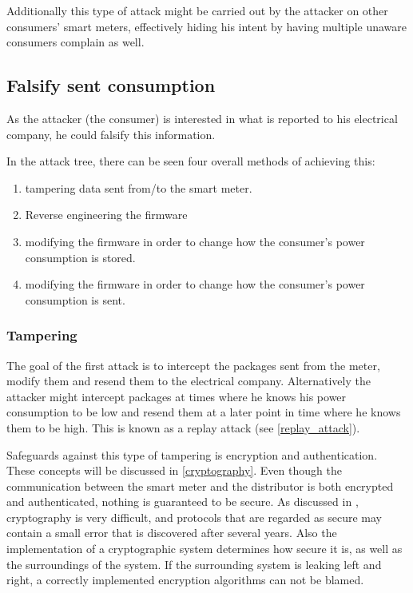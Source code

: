 Additionally this type of attack might be carried out by the attacker on other consumers' smart meters, effectively hiding his intent by having multiple unaware consumers complain as well.

\subsection{Falsify sent consumption}
As the attacker (the consumer) is interested in what is reported to his electrical company, he could falsify this information.

In the attack tree, there can be seen four overall methods of achieving this:
\begin{enumerate}
  \item tampering data sent from/to the smart meter.
  \item Reverse engineering the firmware 
  \item modifying the firmware in order to change how the consumer's power consumption is stored.
  \item modifying the firmware in order to change how the consumer's power consumption is sent.
\end{enumerate}

\subsubsection{Tampering}
The goal of the first attack is to intercept the packages sent from the meter, modify them and resend them to the electrical company.
Alternatively the attacker might intercept packages at times where he knows his power consumption to be low and resend them at a later point in time where he knows them to be high.
This is known as a replay attack (see \cref{replay_attack}).

Safeguards against this type of tampering is encryption and authentication. 
These concepts will be discussed in \cref{cryptography}.
Even though the communication between the smart meter and the distributor is both encrypted and authenticated, nothing is guaranteed to be secure.
As discussed in \citet{cryptoenginering}, cryptography is very difficult, and protocols that are regarded as secure may contain a small error that is discovered after several years.
Also the implementation of a cryptographic system determines how secure it is, as well as the surroundings of the system. \citep{cryptoenginering}
If the surrounding system is leaking left and right, a correctly implemented encryption algorithms can not be blamed.

